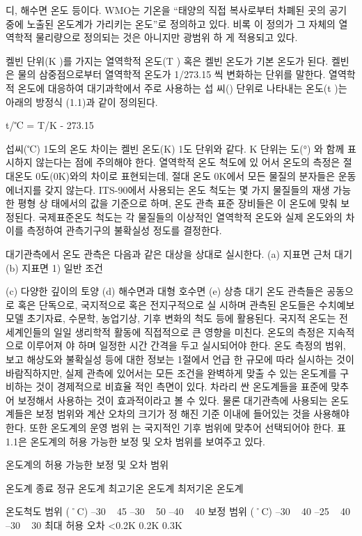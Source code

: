 디, 해수면 온도 등이다. WMO는 기온을 “태양의 직접 복사로부터 차폐된
곳의 공기 중에 노출된 온도계가 가리키는 온도”로 정의하고 있다. 비록 이
정의가 그 자체의 열역학적 물리량으로 정의되는 것은 아니지만 광범위 하
게 적용되고 있다.

켈빈 단위(K )를 가지는 열역학적 온도(T ) 혹은 켈빈 온도가 기본 온도가
된다. 켈빈은 물의 삼중점으로부터 열역학적 온도가 1/273.15 씩 변화하는
단위를 말한다. 열역학적 온도에 대응하여 대기과학에서 주로 사용하는 섭
씨() 단위로 나타내는 온도(t )는 아래의 방정식 (1.1)과 같이 정의된다.

t/℃ = T/K - 273.15

섭씨(℃) 1도의 온도 차이는 켈빈 온도(K) 1도 단위와 같다. K 단위는 도(°)
와 함께 표시하지 않는다는 점에 주의해야 한다. 열역학적 온도 척도에 있
어서 온도의 측정은 절대온도 0도(0K)와의 차이로 표현되는데, 절대 온도
0K에서 모든 물질의 분자들은 운동 에너지를 갖지 않는다.
ITS-90에서 사용되는 온도 척도는 몇 가지 물질들의 재생 가능한 평형 상
태에서의 값을 기준으로 하며, 온도 관측 표준 장비들은 이 온도에 맞춰 보
정된다. 국제표준온도 척도는 각 물질들의 이상적인 열역학적 온도와 실제
온도와의 차이를 측정하여 관측기구의 불확실성 정도를 결정한다.


대기관측에서 온도 관측은 다음과 같은 대상을 상대로 실시한다.
(a) 지표면 근처 대기
(b) 지표면
1) 일반 조건

(c) 다양한 깊이의 토양
(d) 해수면과 대형 호수면
(e) 상층 대기
온도 관측들은 공동으로 혹은 단독으로, 국지적으로 혹은 전지구적으로 실
시하며 관측된 온도들은 수치예보 모델 초기자료, 수문학, 농업기상, 기후
변화의 척도 등에 활용된다. 국지적 온도는 전 세계인들의 일일 생리학적
활동에 직접적으로 큰 영향을 미친다. 온도의 측정은 지속적으로 이루어져
야 하며 일정한 시간 간격을 두고 실시되어야 한다.
온도 측정의 범위, 보고 해상도와 불확실성 등에 대한 정보는 1절에서 언급
한 규모에 따라 실시하는 것이 바람직하지만, 실제 관측에 있어서는 모든
조건을 완벽하게 맞출 수 있는 온도계를 구비하는 것이 경제적으로 비효율
적인 측면이 있다. 차라리 싼 온도계들을 표준에 맞추어 보정해서 사용하는
것이 효과적이라고 볼 수 있다.
물론 대기관측에 사용되는 온도계들은 보정 범위와 계산 오차의 크기가 정
해진 기준 이내에 들어있는 것을 사용해야 한다. 또한 온도계의 운영 범위
는 국지적인 기후 범위에 맞추어 선택되어야 한다. 표 1.1은 온도계의 허용
가능한 보정 및 오차 범위를 보여주고 있다.


온도계의 허용 가능한 보정 및 오차 범위

온도계 종료 정규 온도계 최고기온 온도계 최저기온 온도계

온도척도 범위 (˚C) –30 ~ 45 –30 ~ 50 –40 ~ 40
보정 범위 (˚C) –30 ~ 40 –25 ~ 40 –30 ~ 30
최대 허용 오차 <0.2K 0.2K 0.3K

